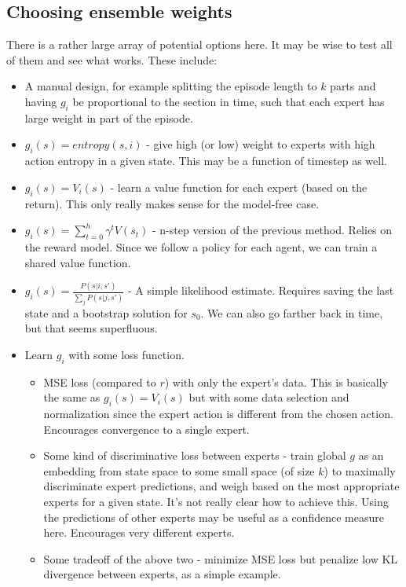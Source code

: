 \documentclass[letterpaper]{article}
\theoremstyle{definition}
\begin{document}
\subsection{Choosing ensemble weights}

There is a rather large array of potential options here. It may be wise to test all of them and see what works.
These include:
\begin{itemize}
	\item A manual design, for example splitting the episode length to $k$ parts and having $g_i$ be proportional to the section in time, such that each expert has large weight in part of the episode.
	\item $g_i(s)  = entropy(s, i)$ - give high (or low) weight to experts with high action entropy in a given state. This may be a function of timestep as well.
	\item $g_i(s)  = V_i(s)$ - learn a value function for each expert (based on the return). This only really makes sense for the model-free case. 
	\item $g_i(s) = \sum_{t=0}^{h}\gamma^t V(s_t)$ - n-step version of the previous method. Relies on the reward model. Since we follow a policy for each agent, we can train a shared value function.
	\item $g_i(s) = \frac{P(s|i,s')}{\sum_j P(s|j, s')}$ - A simple likelihood estimate. Requires saving the last state and a bootstrap solution for $s_0$. We can also go farther back in time, but that seems superfluous.
	\item Learn $g_i$ with some loss function. 
	\begin{itemize}
	 	\item MSE loss (compared to $r$) with only the expert's data. This is basically the same as $g_i(s)  = V_i(s)$ but with some data selection and normalization since the expert action is different from the chosen action. Encourages convergence to a single expert.
	 	\item Some kind of discriminative loss between experts - train global $g$ as an embedding from state space to some small space (of size $k$) to maximally discriminate expert predictions, and weigh based on the most appropriate experts for a given state. It's not really clear how to achieve this. Using the predictions of other experts may be useful as a confidence measure here. Encourages very different experts.
	 	\item Some tradeoff of the above two - minimize MSE loss but penalize low KL divergence between experts, as a simple example.
	\end{itemize}
\end{itemize}

\clearpage


\end{document}
